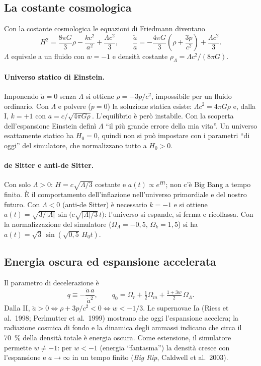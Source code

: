 \documentclass[11pt,a4paper]{article}
\newcommand{\Om}{\Omega_m}
\newcommand{\Or}{\Omega_r}
\newcommand{\OL}{\Omega_\Lambda}
\newcommand{\Ok}{\Omega_k}
\begin{document}
\subsection{La costante cosmologica}
Con la costante cosmologica le equazioni di Friedmann diventano
\begin{equation}
  H^2 = \frac{8\pi G}{3}\rho - \frac{kc^2}{a^2} + \frac{\Lambda c^2}{3}, \qquad
  \frac{\ddot a}{a} = -\frac{4\pi G}{3}\left(\rho+\frac{3p}{c^2}\right) + \frac{\Lambda c^2}{3}.
\end{equation}
$\Lambda$ equivale a un fluido con $w=-1$ e densità costante $\rho_\Lambda=\Lambda c^2/(8\pi G)$.

\paragraph{Universo statico di Einstein.} Imponendo $\ddot a=0$ senza $\Lambda$ si ottiene $\rho=-3p/c^2$, impossibile per un fluido ordinario. Con $\Lambda$ e polvere ($p=0$) la soluzione statica esiste: $\Lambda c^2=4\pi G\rho$ e, dalla I, $k=+1$ con $a=c/\sqrt{4\pi G\rho}$. L'equilibrio è però instabile. Con la scoperta dell'espansione Einstein definì $\Lambda$ ``il più grande errore della mia vita''. Un universo esattamente statico ha $H_0=0$, quindi non si può impostare con i parametri ``di oggi'' del simulatore, che normalizzano tutto a $H_0>0$.

\paragraph{de Sitter e anti-de Sitter.} Con solo $\Lambda>0$: $H=c\sqrt{\Lambda/3}$ costante e $a(t)\propto e^{Ht}$; non c'è Big Bang a tempo finito. È il comportamento dell'inflazione nell'universo primordiale e del nostro futuro. Con $\Lambda<0$ (anti-de Sitter) è necessario $k=-1$ e si ottiene $a(t)=\sqrt{3/|\Lambda|}\,\sin\!\big(c\sqrt{|\Lambda|/3}\,t\big)$: l'universo si espande, si ferma e ricollassa.
Con la normalizzazione del simulatore ($\OL=-0{,}5$, $\Ok=1{,}5$) si ha $a(t)=\sqrt3\,\sin(\sqrt{0{,}5}\,H_0t)$.

\subsection{Energia oscura ed espansione accelerata}
Il parametro di decelerazione è
\begin{equation}
  q \equiv -\frac{\ddot a\,a}{\dot a^2}, \qquad
  q_0 = \Or + \tfrac12\Om + \tfrac{1+3w}{2}\,\OL .
\end{equation}
Dalla II, $\ddot a>0 \iff \rho+3p/c^2<0 \iff w<-1/3$.
Le supernovae Ia (Riess et al.\ 1998; Perlmutter et al.\ 1999) mostrano che oggi l'espansione accelera; la radiazione cosmica di fondo e la dinamica degli ammassi indicano che circa il \SI{70}{\percent} della densità totale è energia oscura.
Come estensione, il simulatore permette $w\neq-1$: per $w<-1$ (energia ``fantasma'') la densità cresce con l'espansione e $a\to\infty$ in un tempo finito (\emph{Big Rip}, Caldwell et al.\ 2003).
\end{document}
